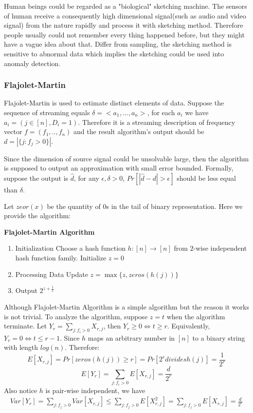\documentclass{article} %
\begin{document}
Human beings could be regarded as a "biological" sketching machine. The sensors of human receive a consequently high dimensional signal(such as audio and video signal) from the nature rapidly and process it with sketching method. Therefore people usually could not remember every thing happened before, but they might have a vague idea about that. Differ from sampling, the sketching method is sensitive to abnormal data which implies the sketching could be used into anomaly detection.

\subsubsection{Flajolet-Martin}
Flajolet-Martin is used to estimate distinct elements of data. Suppose the sequence of streaming equals $\delta = <a_1, ..., a_n>$, for each $a_i$ we have $a_i = (j \in [n], D_i = 1)$. Therefore it is a streaming description of frequency vector $f = (f_1, .., f_n)$ and the result algorithm's output should be $d = |\{j : f_j > 0\}|$.

Since the dimension of source signal could be unsolvable large, then the algorithm is supposed to output an approximation with small error bounded. Formally, suppose the output is $\hat{d}$, for any $\epsilon, \delta > 0$, $Pr[|\hat{d}-d|>\epsilon]$ should be less equal than $\delta$.

Let $zeor(x)$ be the quantity of $0$s in the tail of binary representation. Here we provide the algorithm:

\textbf{Flajolet-Martin Algorithm}
\begin{enumerate}
\item Initialization
\subitem Choose a hash function $h:[n] \rightarrow [n]$ from $2$-wise independent hash function family.
\subitem Initialize $z = 0$
\item Processing Data
\subitem Update $z = \max\{z, zeros(h(j))\}$
\item Output
\subitem $2^{z+\frac{1}{2}}$
\end{enumerate}
Although Flajolet-Martin Algorithm is a simple algorithm but the reason it works is not trivial. To analyze the algorithm, suppose $z = t$ when the algorithm terminate. Let $Y_r = \sum_{j:f_i>0}X_{r,j}$, then $Y_r \ge 0 \Leftrightarrow t \ge r$. Equivalently, $Y_r = 0 \Leftrightarrow t \le r - 1$. Since $h$ maps an arbitrary number in $[n]$ to a binary string with length $log(n)$. Therefore:
$$E[X_{r, j}] = Pr[zeros(h(j)) \ge r] = Pr[2^r divides h(j)] = \frac{1}{2^r}$$
$$E[Y_r] = \sum_{j:f_i > 0}E[X_{r,j}] = \frac{d}{2^r}$$
Also notice $h$ is pair-wise independent, we have
\begin{eqnarray*}
Var[Y_r] = \sum_{j:f_j>0}Var[X_{r,j}]
\le \sum_{j:f_j>0}E[X^2_{r,j}]
=\sum_{j:f_j>0}E[X_{r, j}]
=\frac{d}{2^r}
\end{eqnarray*}
\end{document}
